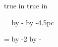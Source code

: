 \leading=15pt

%
%

\pdfhorigin=0pt
\pdfvorigin=0pt

\newdimen\edgemargin
\newdimen\spinemargin
\def\setspinemargin#1{
  \edgemargin=#1
  \spinemargin=\pdfpagewidth
    \advance\spinemargin by -\hsize
    \advance\spinemargin by -#1
}

\def\leftmargin{\ifodd\pageno\edgemargin\else\spinemargin\fi}

 true in   %
 true in  %
\hsize=22pc               %
\vsize=39pc               %
\voffset=4.5pc            %
\setspinemargin{4.5pc}    %

%
%

\def\clearedpagetrue{\global\let\ifclearedpage=\iftrue}
\def\clearedpagefalse{\global\let\ifclearedpage=\iffalse}
\def\displaypagetrue{\global\let\ifdisplaypage=\iftrue}
\def\displaypagefalse{\global\let\ifdisplaypage=\iffalse}
\clearedpagefalse
\displaypagefalse

\def\facingpages{%
  \ifclearedpage\headline={\line{}}\footline={\line{}}\fi%
  \ifdisplaypage\headline={\line{}}\footline={\displaypagefootline}\fi%
  \global\clearedpagefalse%
  \global\displaypagefalse%
  \shipout\vbox{\moveright\leftmargin\vbox{\makeheadline\pagebody\makefootline}}%
  \advancepageno%
  \ifnum\outputpenalty>-20000 \else\dosupereject\fi%
}

\output{\facingpages}

\newdimen\headlineskip

\headlineskip=\topskip %
\advance\headlineskip by -2\leading %
\advance\headlineskip by -\runningheadersize %

